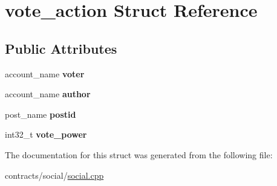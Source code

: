\hypertarget{structvote__action}{}\section{vote\+\_\+action Struct Reference}
\label{structvote__action}
\subsection*{Public Attributes}
\begin{DoxyCompactItemize}
\item 
\mbox{\label{structvote__action_a50d5543f6543b6a5d04c05e956b02ee6}} 
account\+\_\+name {\bfseries voter}
\item 
\mbox{\label{structvote__action_acada6975cd2108f5cdbe55a9889f32f5}} 
account\+\_\+name {\bfseries author}
\item 
\mbox{\label{structvote__action_a6dd81a00ba952008447be08a5ceb149b}} 
post\+\_\+name {\bfseries postid}
\item 
\mbox{\label{structvote__action_a6bc0eb4b616725a55d56b8264d1b361c}} 
int32\+\_\+t {\bfseries vote\+\_\+power}
\end{DoxyCompactItemize}


The documentation for this struct was generated from the following file\+:\begin{DoxyCompactItemize}
\item 
contracts/social/\mbox{\hyperlink{social_8cpp}{social.\+cpp}}\end{DoxyCompactItemize}
